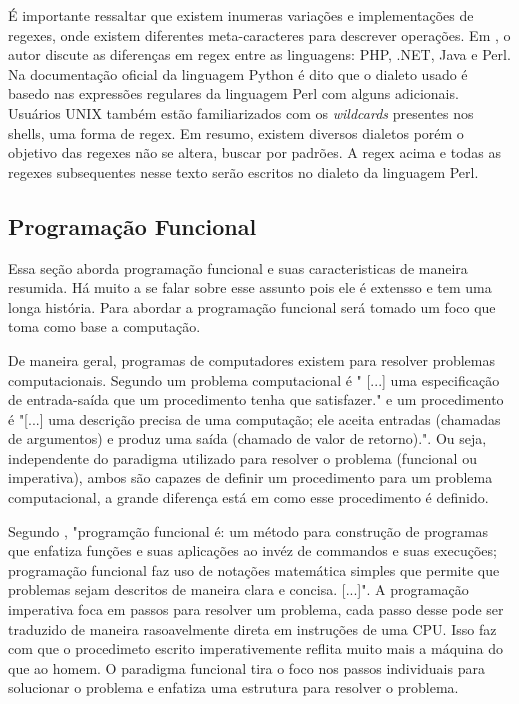 É importante ressaltar que existem inumeras variações e implementações de regexes, onde existem diferentes meta-caracteres para descrever operações.
Em \cite{mastering}, o autor discute as diferenças em regex entre as linguagens: PHP, .NET, Java e Perl.
Na documentação oficial da linguagem Python \cite{python-re} é dito que o dialeto usado é basedo nas expressões regulares da linguagem Perl com alguns adicionais.
Usuários UNIX também estão familiarizados com os \emph{wildcards} presentes nos shells, uma forma de regex.
Em resumo, existem diversos dialetos porém o objetivo das regexes não se altera, buscar por padrões.
A regex acima e todas as regexes subsequentes nesse texto serão escritos no dialeto da linguagem Perl. 

\subsection{Programação Funcional}

Essa seção aborda programação funcional e suas caracteristicas de maneira resumida.
Há muito a se falar sobre esse assunto pois ele é extensso e tem uma longa história.
Para abordar a programação funcional será tomado um foco que toma como base a computação.

De maneira geral, programas de computadores existem para resolver problemas computacionais.
Segundo \cite{matrix} um problema computacional é
" [...] uma especificação de entrada-saída que um procedimento tenha que satisfazer."
e um procedimento é
"[...] uma descrição precisa de uma computação; ele aceita entradas (chamadas de argumentos) e produz uma saída (chamado de valor de retorno).".
Ou seja, independente do paradigma utilizado para resolver o problema (funcional ou imperativa), ambos são capazes de definir um procedimento para um problema computacional, a grande diferença está em como esse procedimento é definido.

Segundo \cite{Bird},
"programção funcional é: um método para construção de programas que enfatiza funções e suas aplicações ao invéz de commandos e suas execuções; programação funcional faz uso de notações matemática simples que permite que problemas sejam descritos de maneira clara e concisa. [...]".
A programação imperativa foca em passos para resolver um problema, cada passo desse pode ser traduzido de maneira rasoavelmente direta em instruções de uma CPU.
Isso faz com que o procedimeto escrito imperativemente reflita muito mais a máquina do que ao homem.
O paradigma funcional tira o foco nos passos individuais para solucionar o problema e enfatiza uma estrutura para resolver o problema.

